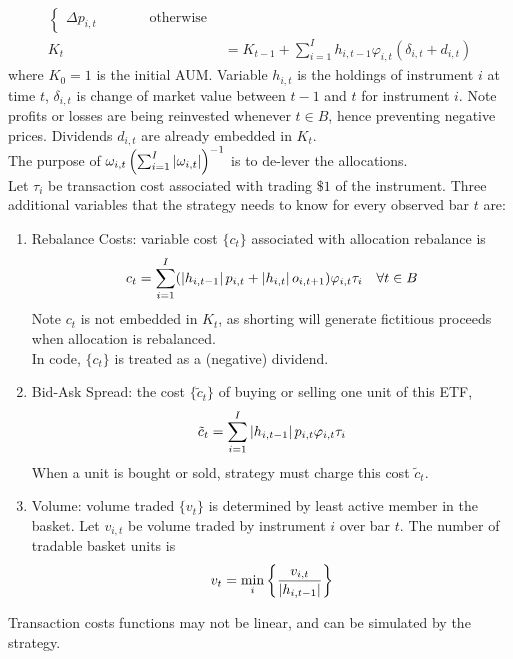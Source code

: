 \documentclass[a4paper,oneside,openany]{book}
\begin{document}
\begin{method}
\begin{align}
\begin{cases}
\Delta p_{i,t} \ \ \ \ \ \ \ \ \ \ \ \ \ \ \ \ \ \text{otherwise}
\end{cases} \nonumber \\
K_t &= K_{t-1} + \sum\limits_{i=1}^I h_{i, t-1} \varphi_{i,t} (\delta_{i,t} + d_{i,t}) \nonumber
\end{align}
where $K_0 = 1$ is the initial AUM. Variable $h_{i,t}$ is the holdings of instrument $i$ at time $t$, $\delta_{i,t}$ is change of market value between $t-1$ and $t$ for instrument $i$. Note profits or losses are being reinvested whenever $t \in B$, hence preventing negative prices. Dividends $d_{i,t}$ are already embedded in $K_t$.\\
The purpose of $\omega_{i,t} \left( \sum_{i=1}^I \left\lvert\omega_{i,t}\right\rvert \right)^{-1}$ is to de-lever the allocations.\\
Let $\tau_i$ be transaction cost associated with trading $\$1$ of the instrument. Three additional variables that the strategy needs to know for every observed bar $t$ are:
\begin{enumerate}[label=\roman*.]
\setlength{\itemsep}{0pt}
\item Rebalance Costs: variable cost $\{c_t\}$ associated with allocation rebalance is
\begin{equation*}
c_t = \sum\limits_{i=1}^I (\left\lvert h_{i, t-1}\right\rvert p_{i,t} + \left\lvert h_{i,t}\right\rvert o_{i, t+1}) \varphi_{i,t} \tau_{i} \ \ \ \forall t \in B \nonumber
\end{equation*}
Note $c_t$ is not embedded in $K_t$, as shorting will generate fictitious proceeds when allocation is rebalanced.\\
In code, $\{c_t\}$ is treated as a (negative) dividend.
\item Bid-Ask Spread: the cost $\{ \tilde{c}_t \}$ of buying or selling one unit of this ETF,
\begin{equation*}
\tilde{c}_t = \sum\limits_{i=1}^I \left\lvert h_{i, t-1}\right\rvert p_{i, t} \varphi_{i,t} \tau_i \nonumber
\end{equation*}
When a unit is bought or sold, strategy must charge this cost $\tilde{c}_t$.
\item Volume: volume traded $\{v_t \}$ is determined by least active member in the basket. Let $v_{i,t}$ be volume traded by instrument $i$ over bar $t$. The number of tradable basket units is
\begin{equation*}
v_t = \min_i \left\{ \frac{v_{i,t}}{\left\lvert h_{i, t-1}\right\rvert} \right\} \nonumber
\end{equation*}
\end{enumerate}
Transaction costs functions may not be linear, and can be simulated by the strategy.
\end{method}
\end{document}
